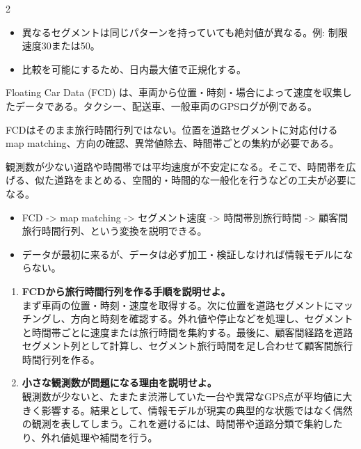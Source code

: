 \clearpage
{}
\begin{multicols}{2}\footnotesize\raggedcolumns
{}
\begin{itemize}
\item 異なるセグメントは同じパターンを持っていても絶対値が異なる。例: 制限速度30または50。
\item 比較を可能にするため、日内最大値で正規化する。
\end{itemize}
Floating Car Data (FCD) は、車両から位置・時刻・場合によって速度を収集したデータである。タクシー、配送車、一般車両のGPSログが例である。\par

FCDはそのまま旅行時間行列ではない。位置を道路セグメントに対応付ける map matching、方向の確認、異常値除去、時間帯ごとの集約が必要である。\par

観測数が少ない道路や時間帯では平均速度が不安定になる。そこで、時間帯を広げる、似た道路をまとめる、空間的・時間的な一般化を行うなどの工夫が必要になる。\par
{}
\begin{itemize}
\item FCD -> map matching -> セグメント速度 -> 時間帯別旅行時間 -> 顧客間旅行時間行列、という変換を説明できる。
\item データが最初に来るが、データは必ず加工・検証しなければ情報モデルにならない。
\end{itemize}
\begin{enumerate}
\item \textbf{FCDから旅行時間行列を作る手順を説明せよ。}\\まず車両の位置・時刻・速度を取得する。次に位置を道路セグメントにマッチングし、方向と時刻を確認する。外れ値や停止などを処理し、セグメントと時間帯ごとに速度または旅行時間を集約する。最後に、顧客間経路を道路セグメント列として計算し、セグメント旅行時間を足し合わせて顧客間旅行時間行列を作る。
\item \textbf{小さな観測数が問題になる理由を説明せよ。}\\観測数が少ないと、たまたま渋滞していた一台や異常なGPS点が平均値に大きく影響する。結果として、情報モデルが現実の典型的な状態ではなく偶然の観測を表してしまう。これを避けるには、時間帯や道路分類で集約したり、外れ値処理や補間を行う。
\end{enumerate}
\end{multicols}


